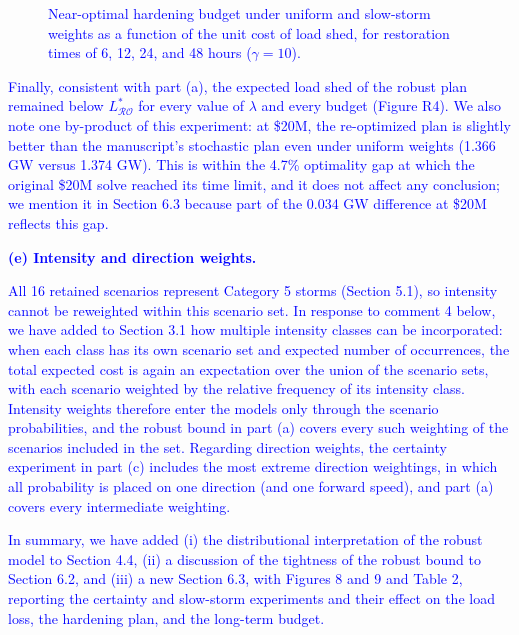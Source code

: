 \documentclass[authoryear,preprint,review,12pt]{elsarticle}\usepackage{amssymb}
\begin{document}
\begin{figure}[htbp]
\centering
\caption{\textcolor{blue}{Near-optimal hardening budget under uniform and slow-storm weights as a function of the unit cost of load shed, for restoration times of 6, 12, 24, and 48 hours ($\gamma = 10$).}}
\label{fig:r5}
\end{figure}

\textcolor{blue}{Finally, consistent with part (a), the expected load shed of the robust plan remained below $L^*_{\mathcal{RO}}$ for every value of $\lambda$ and every budget (Figure R4). We also note one by-product of this experiment: at \$20M, the re-optimized plan is slightly better than the manuscript's stochastic plan even under uniform weights (1.366 GW versus 1.374 GW). This is within the 4.7\% optimality gap at which the original \$20M solve reached its time limit, and it does not affect any conclusion; we mention it in Section 6.3 because part of the 0.034 GW difference at \$20M reflects this gap.}

\medskip
\textcolor{blue}{\textbf{(e) Intensity and direction weights.}}

\textcolor{blue}{All 16 retained scenarios represent Category 5 storms (Section 5.1), so intensity cannot be reweighted within this scenario set. In response to comment 4 below, we have added to Section 3.1 how multiple intensity classes can be incorporated: when each class has its own scenario set and expected number of occurrences, the total expected cost is again an expectation over the union of the scenario sets, with each scenario weighted by the relative frequency of its intensity class. Intensity weights therefore enter the models only through the scenario probabilities, and the robust bound in part (a) covers every such weighting of the scenarios included in the set. Regarding direction weights, the certainty experiment in part (c) includes the most extreme direction weightings, in which all probability is placed on one direction (and one forward speed), and part (a) covers every intermediate weighting.}

\textcolor{blue}{In summary, we have added (i) the distributional interpretation of the robust model to Section 4.4, (ii) a discussion of the tightness of the robust bound to Section 6.2, and (iii) a new Section 6.3, with Figures 8 and 9 and Table 2, reporting the certainty and slow-storm experiments and their effect on the load loss, the hardening plan, and the long-term budget.}
\end{document}
